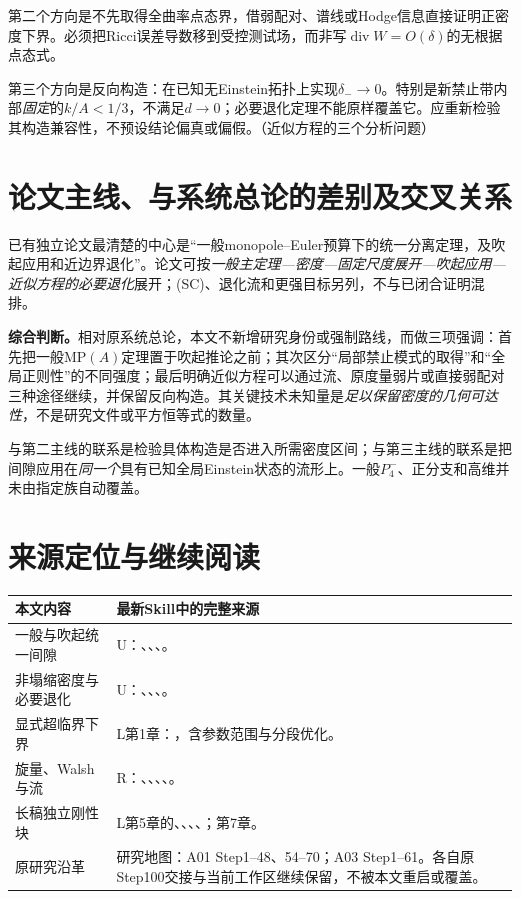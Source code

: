 \documentclass[UTF8,fontset=fandol,zihao=-4]{ctexart}
\theoremstyle{research}
\DeclareMathOperator{\diver}{div}
\numberwithin{equation}{section}
\begin{document}
第二个方向是不先取得全曲率点态界，借弱配对、谱线或Hodge信息直接证明正密度下界。必须把Ricci误差导数移到受控测试场，而非写$\diver W=O(\delta)$的无根据点态式。

第三个方向是反向构造：在已知无Einstein拓扑上实现$\delta_-\to0$。特别是新禁止带内部\emph{固定}的$k/A<1/3$，不满足$d\to0$；必要退化定理不能原样覆盖它。应重新检验其构造兼容性，不预设结论偏真或偏假。\cite{R}（近似方程的三个分析问题）

\section{论文主线、与系统总论的差别及交叉关系}
已有独立论文最清楚的中心是“一般monopole--Euler预算下的统一分离定理，及吹起应用和近边界退化”。论文可按\emph{一般主定理---密度---固定尺度展开---吹起应用---近似方程的必要退化}展开；(SC)、退化流和更强目标另列，不与已闭合证明混排。

\textbf{综合判断。}相对原系统总论，本文不新增研究身份或强制路线，而做三项强调：首先把一般$\mathrm{MP}(A)$定理置于吹起推论之前；其次区分“局部禁止模式的取得”和“全局正则性”的不同强度；最后明确近似方程可以通过流、原度量弱片或直接弱配对三种途径继续，并保留反向构造。其关键技术未知量是\emph{足以保留密度的几何可达性}，不是研究文件或平方恒等式的数量。

与第二主线的联系是检验具体构造是否进入所需密度区间；与第三主线的联系是把间隙应用在\emph{同一个}具有已知全局Einstein状态的流形上。一般$P_4^-$、正分支和高维并未由指定族自动覆盖。

\section{来源定位与继续阅读}
\begin{longtable}{P{.28\textwidth}P{.64\textwidth}}
\toprule 本文内容 & 最新Skill中的完整来源\\\midrule\endhead
一般与吹起统一间隙 & U：、、、。\\
非塌缩密度与必要退化 & U：、、、。\\
显式超临界下界 & L第1章：，含参数范围与分段优化。\\
旋量、Walsh与流 & R：、、、、。\\
长稿独立刚性块 & L第5章的、、、、；第7章。\\
原研究沿革 & 研究地图：A01 Step1--48、54--70；A03 Step1--61。各自原Step100交接与当前工作区继续保留，不被本文重启或覆盖。\\\bottomrule
\end{longtable}
\end{document}
